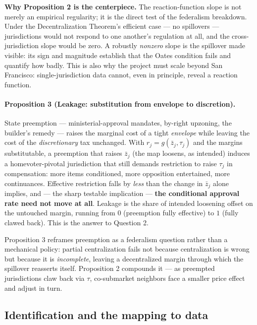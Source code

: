 \documentclass[11pt]{article}
\begin{document}
\medskip
\noindent \textbf{Why Proposition 2 is the centerpiece.} The reaction-function slope is not merely an
empirical regularity; it is the direct test of the federalism breakdown. Under the Decentralization
Theorem's efficient case --- no spillovers --- jurisdictions would not respond to one another's
regulation at all, and the cross-jurisdiction slope would be zero. A robustly \emph{nonzero} slope is
the spillover made visible: its sign and magnitude establish that the Oates condition fails and
quantify how badly. This is also why the project must scale beyond San Francisco: single-jurisdiction
data cannot, even in principle, reveal a reaction function.

\paragraph{Proposition 3 (Leakage: substitution from envelope to discretion).}
State preemption --- ministerial-approval mandates, by-right upzoning, the builder's remedy --- raises
the marginal cost of a tight \emph{envelope} while leaving the cost of the \emph{discretionary} tax
unchanged. With $r_j = g(\bar z_j, \tau_j)$ and the margins substitutable, a preemption that raises
$\bar z_j$ (the map loosens, as intended) induces a homevoter-pivotal jurisdiction that still demands
restriction to raise $\tau_j$ in compensation: more items conditioned, more opposition entertained,
more continuances. Effective restriction falls by \emph{less} than the change in $\bar z_j$ alone
implies, and --- the sharp testable implication --- \textbf{the conditional approval rate need not
move at all}. Leakage is the share of intended loosening offset on the untouched margin, running from
$0$ (preemption fully effective) to $1$ (fully clawed back). This is the answer to Question 2.

\medskip
\noindent Proposition 3 reframes preemption as a federalism question rather than a mechanical policy:
partial centralization fails not because centralization is wrong but because it is \emph{incomplete},
leaving a decentralized margin through which the spillover reasserts itself. Proposition 2 compounds
it --- as preempted jurisdictions claw back via $\tau$, co-submarket neighbors face a smaller price
effect and adjust in turn.

\subsection{Identification and the mapping to data}
\end{document}
